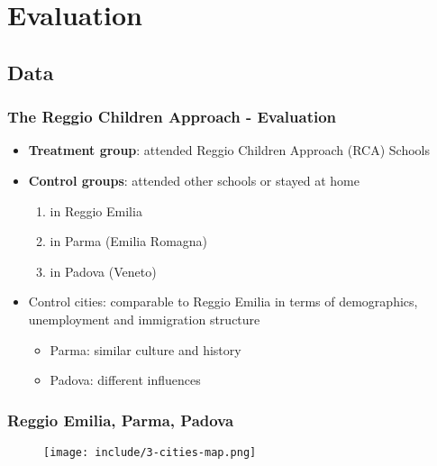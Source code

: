 \documentclass{beamer}
\begin{document}
\section{Evaluation}\label{sec:Eval}
\subsection{Data}
\begin{frame}
\frametitle{The Reggio Children Approach - Evaluation} 
\begin{itemize}

\item\textbf{Treatment group}: attended Reggio Children Approach (RCA) Schools
\smallskip
\item\textbf{Control groups}: attended other schools or stayed at home
\begin{enumerate}
\item in Reggio Emilia
\item in Parma (Emilia Romagna) 
\item in Padova (Veneto)
\end{enumerate}
\vspace{3ex}
\item Control cities: comparable to Reggio Emilia in terms of demographics, unemployment and immigration structure
\begin{itemize}
	\item Parma: similar culture and history
	\item Padova: different influences
\end{itemize}

\end{itemize}
\end{frame} 
\begin{frame}
\frametitle{Reggio Emilia, Parma, Padova} 
\begin{center}
\begin{figure}
\texttt{[image: include/3-cities-map.png]}
\end{figure}
\end{center}
\end{frame}
\end{document}

